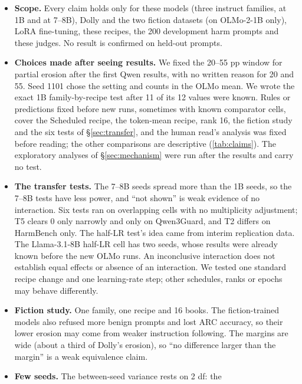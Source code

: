\documentclass[11pt]{article}
\begin{document}
\begin{itemize}
  \item \textbf{Scope.} Every claim holds only for these models (three
        instruct families, at 1B and at 7--8B), Dolly and the two fiction
        datasets (on OLMo-2-1B only), LoRA fine-tuning, these recipes, the 200
        development harm prompts and these judges. No result is confirmed on
        held-out prompts.
  \item \textbf{Choices made after seeing results.} We fixed the 20--55 pp
        window for partial erosion after the first Qwen results, with no
        written reason for 20 and 55. Seed 1101 chose the setting and counts in
        the OLMo mean. We wrote the exact 1B family-by-recipe test after 11 of
        its 12 values were known. Rules or predictions fixed before new
        runs, sometimes with known comparator cells, cover the Scheduled recipe,
        the token-mean recipe, rank 16, the
        fiction study and the six tests of \S\ref{sec:transfer}, and the human
        read's analysis was fixed before reading; the other comparisons are
        descriptive (\cref{tab:claims}). The exploratory analyses of
        \S\ref{sec:mechanism} were run after the results and carry no test.
  \item \textbf{The transfer tests.} The 7--8B seeds spread more than the 1B
        seeds, so the 7--8B tests have less power, and ``not shown'' is weak
        evidence of no interaction. Six tests ran on overlapping cells with no
        multiplicity adjustment; T5 clears 0 only narrowly and only on
        Qwen3Guard, and T2 differs on HarmBench only. The half-LR test's idea
        came from interim replication data. The Llama-3.1-8B half-LR cell has
        two seeds, whose results were already known before the new OLMo runs.
        An inconclusive interaction does not establish equal effects or absence
        of an interaction. We tested one standard recipe change and one learning-rate
        step; other schedules, ranks or epochs may behave differently.
  \item \textbf{Fiction study.} One family, one recipe and 16 books. The
        fiction-trained models also refused more benign prompts and lost ARC
        accuracy, so their lower erosion may come from weaker instruction
        following. The margins are wide (about a third of Dolly's erosion), so
        ``no difference larger than the margin'' is a weak equivalence claim.
  \item \textbf{Few seeds.} The between-seed variance rests on 2 df: the

\end{itemize}
\end{document}
